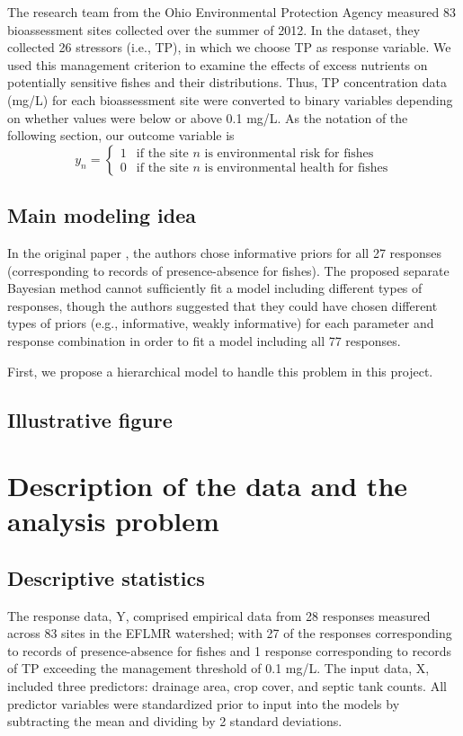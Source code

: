 \documentclass[a4paper]{artikel3}
\begin{document}
The research team from the Ohio Environmental Protection Agency measured 83 bioassessment sites collected over the summer of 2012. In the dataset, they collected 26 stressors (i.e., TP), in which we choose TP as response variable. We used this management criterion to examine the effects of excess nutrients on potentially sensitive ﬁshes and their distributions. Thus, TP concentration data (mg/L) for each bioassessment site were converted to binary variables depending on whether values were below or above 0.1 mg/L. As the notation of the following section, our outcome variable is
\begin{equation*}
y_n =
    \begin{cases}
        1 & \text{if the site $n$ is environmental risk for fishes}\\
        0 & \text{if the site $n$ is environmental health for fishes}
    \end{cases}
\end{equation*}

\subsection{Main modeling idea}


In the original paper \cite{martin2018empirically}, the authors chose informative priors for all 27 responses (corresponding to records of presence-absence for ﬁshes). The proposed separate Bayesian method cannot sufﬁciently fit a model including different types of responses, though the authors suggested that they could have chosen different types of priors (e.g., informative, weakly informative) for each parameter and response combination in order to ﬁt a model including all 77 responses.

First, we propose a hierarchical model to handle this problem in this project.

\subsection{Illustrative figure}

\section{Description of the data and the analysis problem}
\subsection{Descriptive statistics}
The response data, Y, comprised empirical data from 28 responses measured across 83 sites in the EFLMR watershed; with 27 of the responses corresponding to records of presence-absence for ﬁshes and 1 response corresponding to records of TP exceeding the management threshold of 0.1 mg/L. The input data, X, included three predictors: drainage area, crop cover, and septic tank counts. All predictor variables were standardized prior to input into the models by subtracting the mean and dividing by 2 standard deviations.
\end{document}
